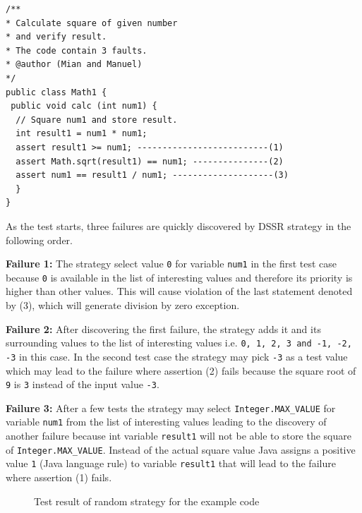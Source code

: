 \bigskip
\begin{lstlisting}
/** 
* Calculate square of given number 
* and verify result. 
* The code contain 3 faults.
* @author (Mian and Manuel)
*/
public class Math1 {
 public void calc (int num1) {
  // Square num1 and store result. 
  int result1 = num1 * num1; 
  assert result1 >= num1; --------------------------(1)
  assert Math.sqrt(result1) == num1; ---------------(2)
  assert num1 == result1 / num1; --------------------(3)
  } 
}
\end{lstlisting}
\bigskip

As the test starts, three failures are quickly discovered by DSSR strategy in the following order.

\indent \textbf{Failure 1:} The strategy select value \verb+0+ for variable \verb+num1+  in the first test case because \verb+0+ is available in the list of interesting values and therefore its priority is higher than other values. This will cause violation of the last statement denoted by (3), which will generate division by zero exception.

\indent \textbf{Failure 2:} After discovering the first failure, the strategy adds it and its surrounding values to the list of interesting values i.e. \verb+0, 1, 2, 3 and -1, -2, -3+ in this case. In the second test case the strategy may pick \verb+-3+ as a test value which may lead to the failure where assertion (2) fails because the square root of \verb+9+ is \verb+3+ instead of the input value \verb+-3+.

\indent \textbf{Failure 3:} After a few tests the strategy may select \verb+Integer.MAX_VALUE+ for variable \verb+num1+  from the list of interesting values leading to the discovery of another failure because int variable \verb+result1+ will not be able to store the square of \verb+Integer.MAX_VALUE+. Instead of the actual square value Java assigns a positive value \verb+1+ (Java language rule) to variable \verb+result1+ that will lead to the failure where assertion (1) fails.

\bigskip
\begin{figure}[H]
\centering
\setlength{\fboxsep}{0pt}%
\setlength{\fboxrule}{1pt}%
\bigskip
\caption{Test result of random strategy for the example code}
\label{fig:random_result}
\end{figure}

